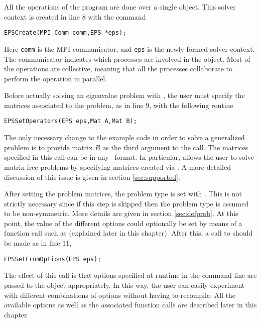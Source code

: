 	All the operations of the program are done over a single  object. This solver context is created in line 8 with the command 
	\begin{Verbatim}[fontsize=\small]
	EPSCreate(MPI_Comm comm,EPS *eps);
	\end{Verbatim}
	Here \texttt{comm} is the MPI communicator, and \texttt{eps} is the newly formed solver context. The communicator indicates which processes are involved in the  object. Most of the  operations are collective, meaning that all the processes collaborate to perform the operation in parallel. 

	Before actually solving an eigenvalue problem with , the user must specify the matrices associated to the problem, as in line 9, with the following routine
	\begin{Verbatim}[fontsize=\small]
	EPSSetOperators(EPS eps,Mat A,Mat B);
	\end{Verbatim}
	The only necessary change to the example code in order to solve a generalized problem is to provide matrix $B$ as the third argument to the call. The matrices specified in this call can be in any \petsc\ format. In particular,  allows the user to solve matrix-free problems by specifying matrices created via . A more detailed discussion of this issue is given in section \ref{sec:supported}.

	After setting the problem matrices, the problem type is set with . This is not strictly necessary since if this step is skipped then the problem type is assumed to be non-symmetric. More details are given in section \ref{sec:defprob}.
	At this point, the value of the different options could optionally be set by means of a function call such as  (explained later in this chapter). After this, a call to  should be made as in line 11, 
	\begin{Verbatim}[fontsize=\small]
	EPSSetFromOptions(EPS eps);
	\end{Verbatim}
	The effect of this call is that options specified at runtime in the command line are passed to the  object appropriately. In this way, the user can easily experiment with different combinations of options without having to recompile. All the available options as well as the associated function calls are described later in this chapter.

